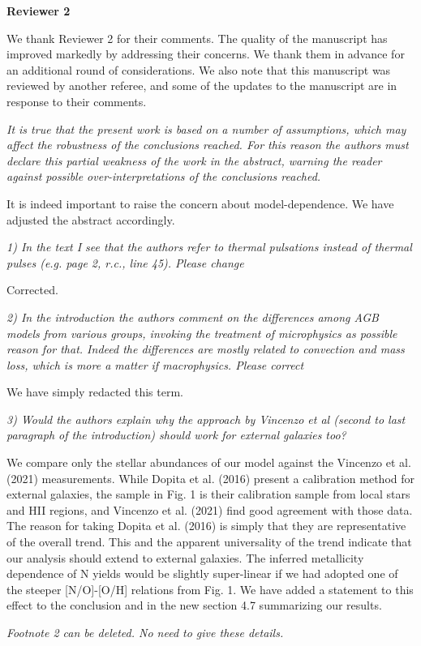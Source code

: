 \documentclass[12pt]{article}
\newcommand\doublebreak[0]{\par\null\par\noindent}
\begin{document}
\newpage
\begin{center}
\textbf{Reviewer 2}
\makebox[\linewidth]{\rule{0.5\textwidth}{0.4pt}}
\end{center}
\par\noindent
We thank Reviewer 2 for their comments.
The quality of the manuscript has improved markedly by addressing their
concerns.
We thank them in advance for an additional round of considerations.
We also note that this manuscript was reviewed by another referee, and some of
the updates to the manuscript are in response to their comments.
\doublebreak
\textit{%
It is true that the present
work is based on a number of assumptions, which may affect the robustness of the
conclusions reached. For this reason the authors must declare this partial
weakness of the work in the abstract, warning the reader against possible
over-interpretations of the conclusions reached.
}
\doublebreak
It is indeed important to raise the concern about model-dependence.
We have adjusted the abstract accordingly.
\doublebreak
\textit{%
1) In the text I see that the authors refer to thermal pulsations instead of
thermal pulses (e.g. page 2, r.c., line 45). Please change
}
\doublebreak
Corrected.
\doublebreak
\textit{%
2) In the introduction the authors comment on the differences among AGB models
from various groups, invoking the treatment of microphysics as possible reason
for that.
Indeed the differences are mostly related to convection and mass loss, which is
more a matter if macrophysics. Please correct
}
\doublebreak
We have simply redacted this term.
\doublebreak
\textit{%
3) Would the authors explain why the approach by Vincenzo et al (second to last
paragraph of the introduction) should work for external galaxies too?
}
\doublebreak
We compare only the stellar abundances of our model against the Vincenzo et al.
(2021) measurements.
While Dopita et al. (2016) present a calibration method for external galaxies,
the sample in Fig. 1 is their calibration sample from local stars and HII
regions, and Vincenzo et al. (2021) find good agreement with those data.
The reason for taking Dopita et al. (2016) is simply that they are
representative of the overall trend.
This and the apparent universality of the trend indicate that our analysis
should extend to external galaxies.
The inferred metallicity dependence of N yields would be slightly super-linear
if we had adopted one of the steeper [N/O]-[O/H] relations from Fig. 1.
We have added a statement to this effect to the conclusion and in the new
section 4.7 summarizing our results.
\doublebreak
\textit{%
Footnote 2 can be deleted. No need to give these details.
}
\end{document}

